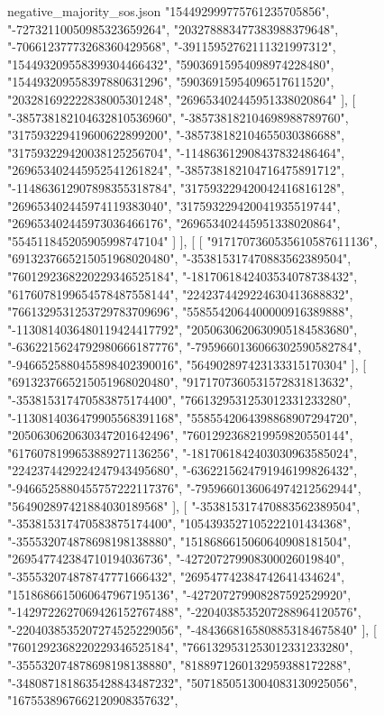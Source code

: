 \begin{filecontents*}[overwrite]{negative_majority_sos.json}
    "154492999775761235705856",
    "-72732110050985323659264",
    "203278883477383988379648",
    "-70661237773268360429568",
    "-39115952762111321997312",
    "154493209558399304466432",
    "59036915954098974228480",
    "154493209558397880631296",
    "59036915954096517611520",
    "203281692222838005301248",
    "269653402445951338020864"
   ],
   [
    "-385738182104632810536960",
    "-385738182104698988789760",
    "317593229419600622899200",
    "-385738182104655030386688",
    "317593229420038125256704",
    "-114863612908437832486464",
    "269653402445952541261824",
    "-385738182104716475891712",
    "-114863612907898355318784",
    "317593229420042416816128",
    "269653402445974119383040",
    "317593229420041935519744",
    "269653402445973036466176",
    "269653402445951338020864",
    "554511845205905998747104"
   ]
  ],
  [
   [
    "9171707360535610587611136",
    "6913237665215051968020480",
    "-353815317470883562389504",
    "7601292368220229346525184",
    "-1817061842403534078738432",
    "6176078199654578487558144",
    "2242374429224630413688832",
    "7661329531253729783709696",
    "5585542064400000916389888",
    "-1130814036480119424417792",
    "2050630620630905184583680",
    "-6362215624792980666187776",
    "-7959660136066302590582784",
    "-9466525880455898402390016",
    "564902897423133315170304"
   ],
   [
    "6913237665215051968020480",
    "9171707360531572831813632",
    "-353815317470583875174400",
    "7661329531253012331233280",
    "-1130814036479905568391168",
    "5585542064398868907294720",
    "2050630620630347201642496",
    "7601292368219959820550144",
    "6176078199653889271136256",
    "-1817061842403030963585024",
    "2242374429224247943495680",
    "-6362215624791946199826432",
    "-9466525880455757222117376",
    "-7959660136064974212562944",
    "564902897421884030189568"
   ],
   [
    "-353815317470883562389504",
    "-353815317470583875174400",
    "1054393527105222101434368",
    "-355532074878698198138880",
    "1518686615060640908181504",
    "269547742384710194036736",
    "-427207279908300026019840",
    "-355532074878747771666432",
    "269547742384742641434624",
    "1518686615060647967195136",
    "-427207279908287592529920",
    "-1429722627069426152767488",
    "-2204038535207288964120576",
    "-2204038535207274525229056",
    "-4843668165808853184675840"
   ],
   [
    "7601292368220229346525184",
    "7661329531253012331233280",
    "-355532074878698198138880",
    "8188971260132959388172288",
    "-3480871818635428843487232",
    "5071850513004083130925056",
    "1675538967662120908357632",

\end{filecontents*}
